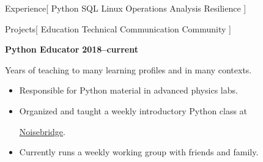 \documentclass[11pt,a4paper]{article}
\newenvironment{worksection}[3]{
    \begin{addmargin}[0.5em]{0em}
    {\large\bfseries #1} \hfill {\bfseries #2}\\%
    \hspace*{1em}#3
    \begin{itemize}
        [label=-, topsep=0pt, itemsep=0.5ex, parsep=0pt, leftmargin=1em]
}{
    \end{itemize}
    \end{addmargin}
    \medskip
}
\newcommand{\Noisebridge}{
  \href{https://www.noisebridge.net/}{Noisebridge}.
}
\begin{document}
\begin{mysection}{Experience}[
    Python
    \textbullet{} SQL
    \textbullet{} Linux
    \textbullet{} Operations
    \textbullet{} Analysis
    \textbullet{} Resilience
]


\end{mysection}

\begin{mysection}{Projects}[
    Education \textbullet{} Technical Communication \textbullet{} Community
]


  \begin{addmargin}[0.5em]{0em}
    {\large\bfseries Python Educator} \hfill {\bfseries 2018--current}%
    \begin{adjustwidth}{1ex}{0ex}

    Years of teaching to many learning profiles and in many contexts.
    \begin{itemize}
        [label=-, topsep=0pt, itemsep=0.5ex, parsep=0pt, leftmargin=1em]

      \item Responsible for Python material in advanced physics labs.
      \item Organized and taught a weekly introductory Python class at
            \Noisebridge
      \item Currently runs a weekly working group with friends and family.

    \end{itemize}
    \end{adjustwidth}
  \end{addmargin}
  \medskip


\end{mysection}
\end{document}

